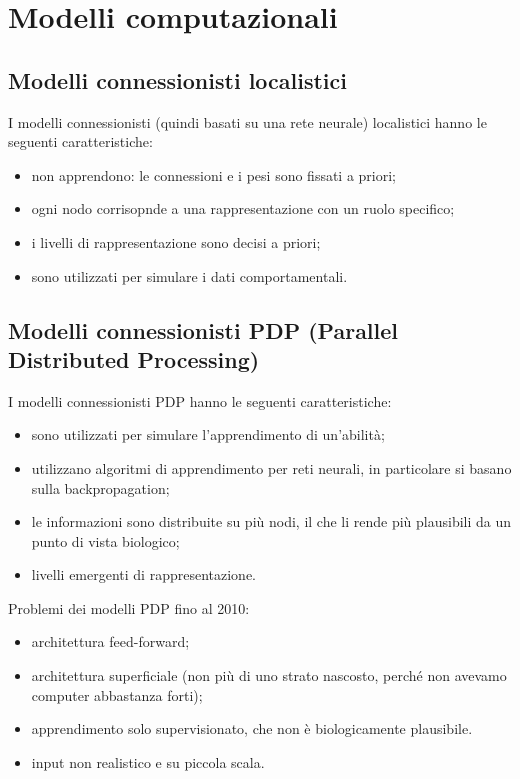 \section{Modelli computazionali}

\subsection{Modelli connessionisti localistici}

I modelli connessionisti (quindi basati su una rete neurale) localistici hanno
le seguenti caratteristiche:
\begin{itemize}
	\item non apprendono: le connessioni e i pesi sono fissati a priori;

	\item ogni nodo corrisopnde a una rappresentazione con un ruolo specifico;

	\item i livelli di rappresentazione sono decisi a priori;

	\item sono utilizzati per simulare i dati comportamentali.
\end{itemize}

\subsection{Modelli connessionisti PDP (Parallel Distributed Processing)}

I modelli connessionisti PDP hanno le seguenti caratteristiche:
\begin{itemize}
	\item sono utilizzati per simulare l'apprendimento di un'abilità;

	\item utilizzano algoritmi di apprendimento per reti neurali, in particolare
		si basano sulla backpropagation;

	\item le informazioni sono distribuite su più nodi, il che li rende più
		plausibili da un punto di vista biologico;

	\item livelli emergenti di rappresentazione.
\end{itemize}

Problemi dei modelli PDP fino al 2010:
\begin{itemize}
	\item architettura feed-forward;

	\item architettura superficiale (non più di uno strato nascosto, perché non
		avevamo computer abbastanza forti);

	\item apprendimento solo supervisionato, che non è biologicamente 
		plausibile.

	\item input non realistico e su piccola scala.
\end{itemize}

